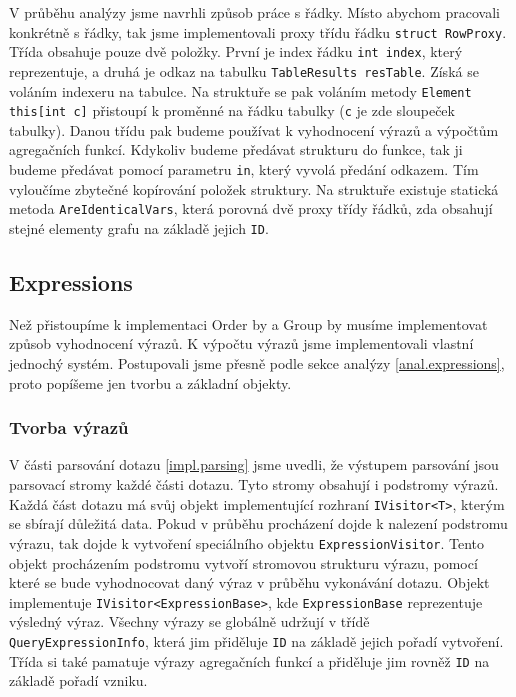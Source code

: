 V průběhu analýzy jsme navrhli způsob práce s řádky. 
Místo abychom pracovali konkrétně s řádky, tak jsme implementovali proxy třídu řádku \texttt{struct RowProxy}.
Třída obsahuje pouze dvě položky. 
První je index řádku \texttt{int index}, který reprezentuje, a druhá je odkaz na tabulku \texttt{TableResults resTable}.
Získá se voláním indexeru na tabulce.
Na struktuře se pak voláním metody \texttt{Element this[int c]} přistoupí k proměnné na řádku tabulky (\texttt{c} je zde sloupeček tabulky).
Danou třídu pak budeme používat k vyhodnocení výrazů a výpočtům agregačních funkcí.
Kdykoliv budeme předávat strukturu do funkce, tak ji budeme předávat pomocí parametru \texttt{in}, který vyvolá předání odkazem.
Tím vyloučíme zbytečné kopírování položek struktury.
Na struktuře existuje statická metoda \texttt{AreIdenticalVars}, která porovná dvě proxy třídy řádků, zda obsahují stejné elementy grafu na základě jejich \texttt{ID}.

\subsection{Expressions}

Než přistoupíme k implementaci Order by a Group by musíme implementovat způsob vyhodnocení výrazů.
K výpočtu výrazů jsme implementovali vlastní jednochý systém.
Postupovali jsme přesně podle sekce analýzy \ref{anal.expressions}, proto popíšeme jen tvorbu a základní objekty.

\subsubsection{Tvorba výrazů}

V části parsování dotazu \ref{impl.parsing} jsme uvedli, že výstupem parsování jsou parsovací stromy každé části dotazu.
Tyto stromy obsahují i podstromy výrazů.
Každá část dotazu má svůj objekt implementující rozhraní \texttt{IVisitor<T>}, kterým se sbírají důležitá data.
Pokud v průběhu procházení dojde k nalezení podstromu výrazu, tak dojde k vytvoření speciálního objektu \texttt{ExpressionVisitor}.
Tento objekt procházením podstromu vytvoří stromovou strukturu výrazu, pomocí které se bude vyhodnocovat daný výraz v průběhu vykonávání dotazu.
Objekt implementuje \texttt{IVisitor<ExpressionBase>}, kde \texttt{ExpressionBase} reprezentuje výsledný výraz.
Všechny výrazy se globálně udržují v třídě \texttt{QueryExpressionInfo}, která jim přiděluje \texttt{ID} na základě jejich pořadí vytvoření.
Třída si také pamatuje výrazy agregačních funkcí a přiděluje jim rovněž \texttt{ID} na základě pořadí vzniku.

